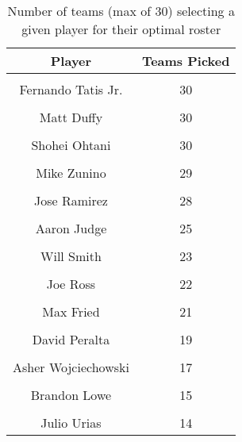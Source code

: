 \begin{table}

\caption{Number of teams (max of 30) selecting a given player for their optimal roster}
\centering
\begin{tabular}[t]{|>{}c|>{}c|}
\hline
Player & Teams Picked\\
\hline
\cellcolor{gray!6}{Darin Ruf} & \cellcolor{gray!6}{30}\\
\hline
Fernando Tatis Jr. & 30\\
\hline
\cellcolor{gray!6}{Juan Soto} & \cellcolor{gray!6}{30}\\
\hline
Matt Duffy & 30\\
\hline
\cellcolor{gray!6}{Matt Olson} & \cellcolor{gray!6}{30}\\
\hline
Shohei Ohtani & 30\\
\hline
\cellcolor{gray!6}{Austin Slater} & \cellcolor{gray!6}{29}\\
\hline
Mike Zunino & 29\\
\hline
\cellcolor{gray!6}{Jace Peterson} & \cellcolor{gray!6}{28}\\
\hline
Jose Ramirez & 28\\
\hline
\cellcolor{gray!6}{Justin Turner} & \cellcolor{gray!6}{26}\\
\hline
Aaron Judge & 25\\
\hline
\cellcolor{gray!6}{Carlos Correa} & \cellcolor{gray!6}{25}\\
\hline
Will Smith & 23\\
\hline
\cellcolor{gray!6}{Andrew Albers} & \cellcolor{gray!6}{22}\\
\hline
Joe Ross & 22\\
\hline
\cellcolor{gray!6}{Jesse Winker} & \cellcolor{gray!6}{21}\\
\hline
Max Fried & 21\\
\hline
\cellcolor{gray!6}{Enrique Hernandez} & \cellcolor{gray!6}{20}\\
\hline
David Peralta & 19\\
\hline
\cellcolor{gray!6}{Jacob Stallings} & \cellcolor{gray!6}{18}\\
\hline
Asher Wojciechowski & 17\\
\hline
\cellcolor{gray!6}{German Marquez} & \cellcolor{gray!6}{17}\\
\hline
Brandon Lowe & 15\\
\hline
\cellcolor{gray!6}{Marcus Semien} & \cellcolor{gray!6}{15}\\
\hline
Julio Urias & 14\\

\end{tabular}
\end{table}
